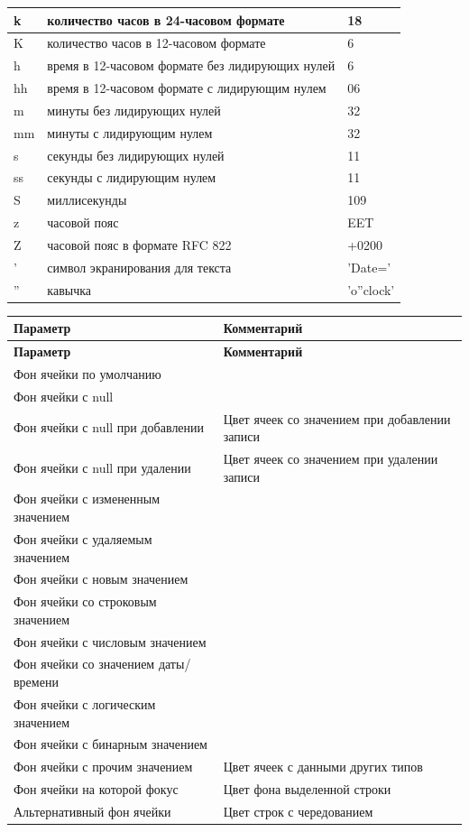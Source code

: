 \begin{longtable}[r]{|>{\ttfamily\centering}m{1.8cm}|m{11.7cm}|m{1.8cm}|}
	k & количество часов в 24-часовом формате & 18 \\\hline
	K & количество часов в 12-часовом формате & 6 \\\hline
	h & время в 12-часовом формате без лидирующих нулей & 6 \\\hline
	hh & время в 12-часовом формате с лидирующим нулем & 06 \\\hline
	m & минуты без лидирующих нулей & 32 \\\hline
	mm & минуты с лидирующим нулем & 32 \\\hline
	s & секунды без лидирующих нулей & 11 \\\hline
	ss & секунды с лидирующим нулем & 11 \\\hline
	S & миллисекунды & 109 \\\hline
	z & часовой пояс & EET \\\hline
	Z & часовой пояс в формате RFC 822 & +0200 \\\hline
	' & символ экранирования для текста & 'Date=' \\\hline
	'' & кавычка & 'o''clock' \\\hline	
\end{longtable}


\begin{longtable}[r]{|>{\ttfamily}m{6cm}|m{9.5cm}|}
	\hline
	\centering\normalfont\bfseries Параметр &
	\centering\arraybslash\bfseries Комментарий\\\hline
	\endfirsthead
	\hline
	\centering\normalfont\bfseries Параметр &
	\centering\arraybslash\bfseries Комментарий\\\hline
	\endhead
	\hline
	Фон ячейки по умолчанию &  \\\hline
	Фон ячейки с null & \\\hline
	Фон ячейки с null при добавлении & Цвет ячеек со значением \ttt{NULL} при добавлении записи \\\hline
	Фон ячейки с null при удалении & Цвет ячеек со значением \ttt{NULL} при удалении записи \\\hline
	Фон ячейки с измененным значением &  \\\hline
	Фон ячейки с удаляемым значением &  \\\hline
	Фон ячейки с новым значением &   \\\hline
	Фон ячейки со строковым значением &  \\\hline
	Фон ячейки с числовым значением &  \\\hline
	Фон ячейки со значением даты/времени & \\\hline
	Фон ячейки с логическим значением & \\\hline
	Фон ячейки с бинарным значением &   \\\hline
	Фон ячейки с прочим значением & Цвет ячеек с данными других типов \\\hline
	Фон ячейки на которой фокус & Цвет фона выделенной строки \\\hline
	Альтернативный фон ячейки & Цвет строк с чередованием \\\hline
\end{longtable}


